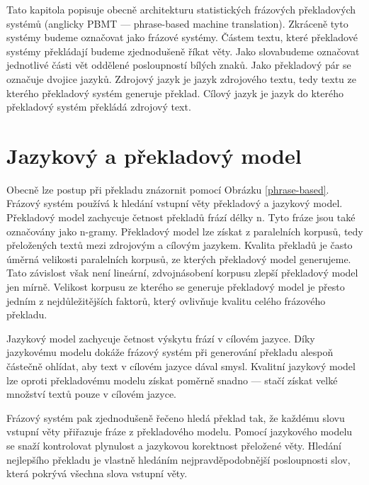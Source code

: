 \documentclass[12pt,a4paper]{report}
\begin{document}
Tato kapitola popisuje obecně architekturu statistických frázových překladových systémů (anglicky PBMT --- phrase-based machine translation). Zkráceně tyto systémy budeme označovat jako \clqq frázové systémy\crqq . Částem textu, které překladové systémy překládají budeme zjednodušeně říkat \clqq věty\crqq . Jako \clqq slova\crqq  budeme označovat jednotlivé části vět oddělené posloupností bílých znaků. Jako překladový pár se označuje dvojice jazyků. Zdrojový jazyk je jazyk zdrojového textu, tedy textu ze kterého překladový systém generuje překlad. Cílový jazyk je jazyk do kterého překladový systém překládá zdrojový text.

\section{Jazykový a překladový model}
Obecně lze postup při překladu znázornit pomocí Obrázku \ref{phrase-based}. Frázový systém používá k hledání vstupní věty překladový a jazykový model. Překladový model zachycuje četnost překladů frází délky n. Tyto fráze jsou také označovány jako n-gramy. Překladový model lze získat z paralelních korpusů, tedy přeložených textů mezi zdrojovým a cílovým jazykem. Kvalita překladů je často úměrná velikosti paralelních korpusů, ze kterých překladový model generujeme. Tato závislost však není lineární, zdvojnásobení korpusu zlepší překladový model jen mírně. Velikost korpusu ze kterého se generuje překladový model je přesto jedním z nejdůležitějších faktorů, který ovlivňuje kvalitu celého frázového překladu.

Jazykový model zachycuje četnost výskytu frází v cílovém jazyce. Díky jazykovému modelu dokáže frázový systém při generování překladu alespoň částečně ohlídat, aby text v cílovém jazyce dával smysl. Kvalitní jazykový model lze oproti překladovému modelu získat poměrně snadno --- stačí získat velké množství textů pouze v cílovém jazyce.

Frázový systém pak zjednodušeně řečeno hledá překlad tak, že každému slovu vstupní věty přiřazuje fráze z překladového modelu. Pomocí jazykového modelu se snaží kontrolovat plynulost a jazykovou korektnost přeložené věty. Hledání nejlepšího překladu je vlastně hledáním nejpravděpodobnější posloupnosti slov, která pokrývá všechna slova vstupní věty.

\end{document}
